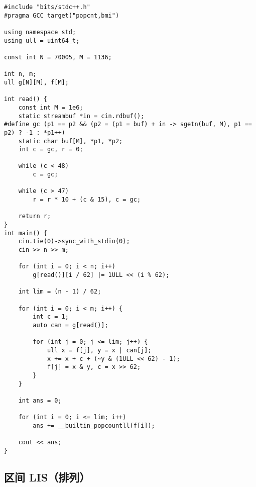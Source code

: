 \documentclass[12pt]{ctexart}
\begin{document}
\begin{lstlisting}
#include "bits/stdc++.h"
#pragma GCC target("popcnt,bmi")

using namespace std;
using ull = uint64_t;

const int N = 70005, M = 1136;

int n, m;
ull g[N][M], f[M];

int read() {
    const int M = 1e6;
    static streambuf *in = cin.rdbuf();
#define gc (p1 == p2 && (p2 = (p1 = buf) + in -> sgetn(buf, M), p1 == p2) ? -1 : *p1++)
    static char buf[M], *p1, *p2;
    int c = gc, r = 0;

    while (c < 48)
        c = gc;

    while (c > 47)
        r = r * 10 + (c & 15), c = gc;

    return r;
}
int main() {
    cin.tie(0)->sync_with_stdio(0);
    cin >> n >> m;

    for (int i = 0; i < n; i++)
        g[read()][i / 62] |= 1ULL << (i % 62);

    int lim = (n - 1) / 62;

    for (int i = 0; i < m; i++) {
        int c = 1;
        auto can = g[read()];

        for (int j = 0; j <= lim; j++) {
            ull x = f[j], y = x | can[j];
            x += x + c + (~y & (1ULL << 62) - 1);
            f[j] = x & y, c = x >> 62;
        }
    }

    int ans = 0;

    for (int i = 0; i <= lim; i++)
        ans += __builtin_popcountll(f[i]);

    cout << ans;
}
\end{lstlisting}

\subsection{区间 LIS（排列）}
\end{document}
